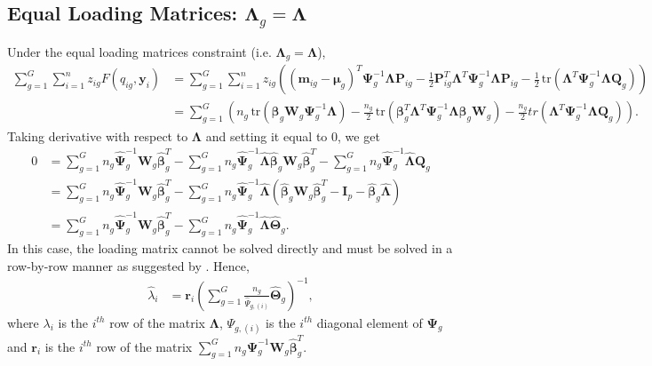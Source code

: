 \documentclass[12pt]{article}
\newcommand{\bI}{\mathbf{I}}
\newcommand{\bP}{\mathbf{P}}
\newcommand{\bQ}{\mathbf{Q}}
\newcommand{\bW}{\mathbf{W}}
\newcommand{\bmm}{\mathbf{m}}
\newcommand{\by}{\mathbf{y}}
\newcommand{\bbeta}{\boldsymbol{\beta}}
\newcommand{\bTheta}{\boldsymbol{\Theta}}
\newcommand{\bmu}{\boldsymbol{\mu}}
\newcommand{\bLambda}{\boldsymbol{\Lambda}}
\newcommand{\bPsi}{\boldsymbol{\Psi}}
\newcommand{\tr}{\,\mbox{tr}}
\begin{document}
\subsection{Equal Loading Matrices: $\bLambda_g = \bLambda$}
Under the equal loading matrices constraint (i.e. $\bLambda_g = \bLambda$),
\begin{align*}
\sum_{g=1}^G\sum_{i=1}^nz_{ig}F(q_{ig},\by_i)&=
\sum_{g=1}^G\sum_{i=1}^nz_{ig}\left((\bmm_{ig}-\bmu_g)^T\bPsi_g^{-1}\bLambda\bP_{ig}-\frac{1}{2}\bP_{ig}^T\bLambda^T\bPsi_g^{-1}\bLambda\bP_{ig}-\frac{1}{2}\tr(\bLambda^T\bPsi_g^{-1}\bLambda\bQ_{g})\right)\\
&=\sum_{g=1}^G\left(n_g\tr\left(\bbeta_g\bW_g\bPsi_g^{-1}\bLambda\right)-\frac{n_g}{2}\tr\left(\bbeta_g^T\bLambda^T\bPsi_g^{-1}\bLambda\bbeta_g\bW_{g}\right) -\frac{n_g}{2}tr(\bLambda^T\bPsi_g^{-1}\bLambda\bQ_{g})\right).
\end{align*}
Taking derivative with respect to $\bLambda$ and setting it equal to 0, we get
\begin{align*}
0&=\sum_{g=1}^Gn_g \hat{\bPsi}_g^{-1}\bW_g\hat{\bbeta}_g^T-\sum_{g=1}^Gn_g\hat{\bPsi}_g^{-1}\hat{\bLambda}\hat{\bbeta}_g\bW_g\hat{\bbeta}_g^T-\sum_{g=1}^G n_g\hat{\bPsi}_g^{-1}\hat{\bLambda}\bQ_{g}\\
&=\sum_{g=1}^G n_g\hat{\bPsi}_g^{-1}\bW_g\hat{\bbeta}_g^T-\sum_{g=1}^Gn_g\hat{\bPsi}_g^{-1}\hat{\bLambda}\left(\hat{\bbeta}_g\bW_g\hat{\bbeta}_g^T-\bI_p-\hat{\bbeta}_g\hat{\bLambda}\right)\\
&=\sum_{g=1}^Gn_g \hat{\bPsi}_g^{-1}\bW_g\hat{\bbeta}_g^T-\sum_{g=1}^Gn_g\hat{\bPsi}_g^{-1}\hat{\bLambda}\hat{\bTheta}_g.
\end{align*}
In this case, the loading matrix cannot be solved directly and must be solved in a row-by-row manner as suggested by \cite{mcnicholas2008}. Hence,
\begin{align}
\hat{\lambda}_i&=\mathbf{r}_i\left(\sum_{g=1}^G\frac{n_g}{\hat{\Psi}_{g,(i)}} \hat{\bTheta}_g\right)^{-1},\label{common_lambda}
\end{align}
where $\lambda_i$ is the $i^{th}$ row of the matrix $\bLambda$, $\Psi_{g,(i)}$ is the $i^{th}$ diagonal element of $\bPsi_g$ and $\mathbf{r}_i$ is the $i^{th}$ row of the matrix $\sum_{g=1}^Gn_g \bPsi_g^{-1}\bW_g \hat{\bbeta}_g^T$.
\end{document}
